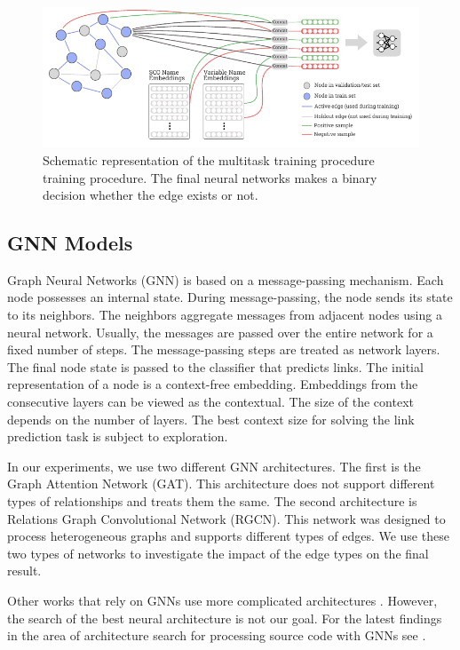 \documentclass[a4paper,twoside]{article}
\begin{document}
\begin{figure}
    \centering
    \includegraphics[width=\textwidth]{model.pdf}
    \caption{Schematic representation of the multitask training procedure training procedure. The final neural networks makes a binary decision whether the edge exists or not.}
    \label{fig:model}
\end{figure}

\subsection{GNN Models}

Graph Neural Networks (GNN) is based on a message-passing mechanism. Each node possesses an internal state. During message-passing, the node sends its state to its neighbors. The neighbors aggregate messages from adjacent nodes using a neural network. Usually, the messages are passed over the entire network for a fixed number of steps. The message-passing steps are treated as network layers. The final node state is passed to the classifier that predicts links. The initial representation of a node is a context-free embedding. Embeddings from the consecutive layers can be viewed as the contextual. The size of the context depends on the number of layers. The best context size for solving the link prediction task is subject to exploration.

In our experiments, we use two different GNN architectures. The first is the Graph Attention Network (GAT). This architecture does not support different types of relationships and treats them the same. The second architecture is Relations Graph Convolutional Network (RGCN). This network was designed to process heterogeneous graphs and supports different types of edges. We use these two types of networks to investigate the impact of the edge types on the final result. 

Other works that rely on GNNs use more complicated architectures \cite{Allamanis2017} \cite{Cvitkovic2018}. However, the search of the best neural architecture is not our goal. For the latest findings in the area of architecture search for processing source code with GNNs see \cite{hellendoorn2020global}.
\end{document}
